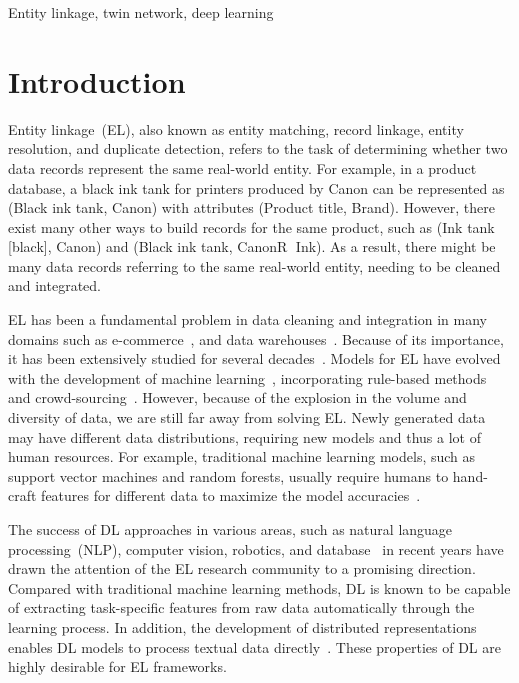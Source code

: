 \documentclass[conference]{IEEEtran}
\begin{document}
\begin{IEEEkeywords}
Entity linkage, twin network, deep learning
\end{IEEEkeywords}


\section{Introduction}\label{sec:intro}

Entity linkage~(EL), also known as entity matching, record linkage, entity resolution, and duplicate detection, refers to the task of determining whether two data records represent the same real-world entity. For example, in a product database, a black ink tank for printers produced by Canon can be represented as (Black ink tank, Canon) with attributes (Product title, Brand). However, there exist many other ways to build records for the same product, such as (Ink tank [black], Canon) and (Black ink tank, Canon\textcircled{R} Ink). As a result, there might be many data records referring to the same real-world entity, needing to be cleaned and integrated. 

EL has been a fundamental problem in data cleaning and integration in many domains such as e-commerce~\cite{gokhale2014corleone,mudgal2018deep}, and data warehouses~\cite{winkler2009data}. Because of its importance, it has been extensively studied for several decades~\cite{dunn1946record,fellegi1969theory,elmagarmid2006duplicate,naumann2010introduction,christen2012data,getoor2012entity,sehili2015privacy,ebraheem2018distributed,mudgal2018deep,trivedi2018linknbed}. Models for EL have evolved with the development of machine learning~\cite{cohen2002learning,sarawagi2002interactive,bilenko2003adaptive,singla2006entity,konda2016magellan}, incorporating rule-based methods~\cite{wang2011entity,fan2009reasoning,singh2017synthesizing,singh2017generating} and crowd-sourcing~\cite{wang2012crowder,stonebraker2013data,vesdapunt2014crowdsourcing,gokhale2014corleone}.
However, because of the explosion in the volume and diversity of data, we are still far away from solving EL. Newly generated data may have different data distributions, requiring new models and thus a lot of human resources. For example, traditional machine learning models, such as support vector machines and random forests, usually require humans to hand-craft features for different data to maximize the model accuracies~\cite{bishop2006pattern}.

The success of DL approaches in various areas, such as natural language processing~(NLP), computer vision, robotics, and database~\cite{lecun2015deep,wang2016database} in recent years have drawn the attention of the EL research community to a promising direction. Compared with traditional machine learning methods, DL is known to be capable of extracting task-specific features from raw data automatically through the learning process. In addition, the development of distributed representations enables DL models to process textual data directly~\cite{mikolov2013distributed,pennington2014glove,bojanowski2017enriching,joulin2017bag}. These properties of DL are highly desirable for EL frameworks.
\end{document}

